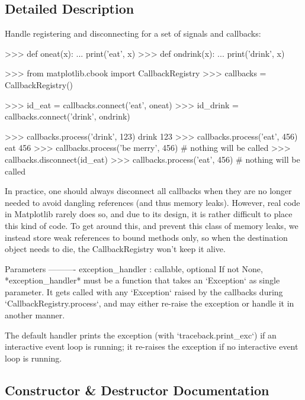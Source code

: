 \subsection{Detailed Description}
\begin{DoxyVerb}Handle registering and disconnecting for a set of signals and callbacks:

    >>> def oneat(x):
    ...    print('eat', x)
    >>> def ondrink(x):
    ...    print('drink', x)

    >>> from matplotlib.cbook import CallbackRegistry
    >>> callbacks = CallbackRegistry()

    >>> id_eat = callbacks.connect('eat', oneat)
    >>> id_drink = callbacks.connect('drink', ondrink)

    >>> callbacks.process('drink', 123)
    drink 123
    >>> callbacks.process('eat', 456)
    eat 456
    >>> callbacks.process('be merry', 456) # nothing will be called
    >>> callbacks.disconnect(id_eat)
    >>> callbacks.process('eat', 456)      # nothing will be called

In practice, one should always disconnect all callbacks when they are
no longer needed to avoid dangling references (and thus memory leaks).
However, real code in Matplotlib rarely does so, and due to its design,
it is rather difficult to place this kind of code.  To get around this,
and prevent this class of memory leaks, we instead store weak references
to bound methods only, so when the destination object needs to die, the
CallbackRegistry won't keep it alive.

Parameters
----------
exception_handler : callable, optional
   If not None, *exception_handler* must be a function that takes an
   `Exception` as single parameter.  It gets called with any `Exception`
   raised by the callbacks during `CallbackRegistry.process`, and may
   either re-raise the exception or handle it in another manner.

   The default handler prints the exception (with `traceback.print_exc`) if
   an interactive event loop is running; it re-raises the exception if no
   interactive event loop is running.
\end{DoxyVerb}
 

\subsection{Constructor \& Destructor Documentation}
\mbox{\label{classmatplotlib_1_1cbook_1_1CallbackRegistry_a9f3b264a1b4c5d2f700636a58d947178}} 
